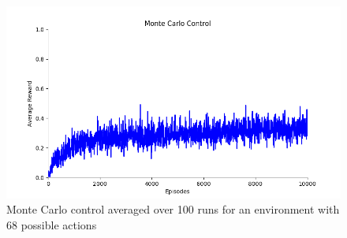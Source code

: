 \begin{figure}[h]
\includegraphics[width=\textwidth]{discretequarter/figure_1}
\caption[Monte Carlo Control for the discretised environment with 68 actions]{Monte Carlo control averaged over 100 runs for an environment with 68 possible actions}
\end{figure}







